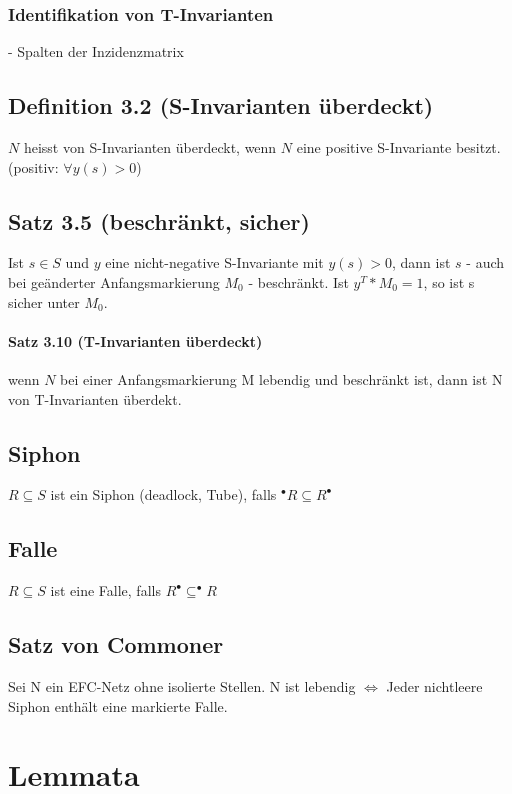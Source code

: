 \documentclass[12pt]{scrreprt}
\begin{document}
\subsection*{Identifikation von T-Invarianten}
- Spalten der Inzidenzmatrix

\section*{Definition 3.2 (S-Invarianten überdeckt)}
$N$ heisst von S-Invarianten überdeckt, wenn $N$ eine positive S-Invariante besitzt. (positiv: $\forall y(s) > 0$)

\section*{Satz 3.5 (beschränkt, sicher)}
Ist $s \in S$ und $y$ eine nicht-negative S-Invariante mit $y(s) > 0$, dann ist $s$ - auch bei geänderter Anfangsmarkierung $M_{0}$ - beschränkt. Ist $y^{T} * M_{0} = 1$, so ist s sicher unter $M_{0}$.

\subsubsection*{Satz 3.10 (T-Invarianten überdeckt)}
wenn $N$ bei einer Anfangsmarkierung M lebendig und beschränkt ist, dann ist N von T-Invarianten überdekt.

\section*{Siphon}
$R \subseteq S$ ist ein Siphon (deadlock, Tube), falls $^\bullet R \subseteq R^\bullet$

\section*{Falle}
$R \subseteq S$ ist eine Falle, falls $R^\bullet \subseteq ^\bullet R$

\section*{Satz von Commoner}
Sei N ein EFC-Netz ohne isolierte Stellen.\newline
N ist lebendig $\Leftrightarrow$ Jeder nichtleere Siphon enthält eine markierte Falle.

\chapter{Lemmata}
\end{document}
